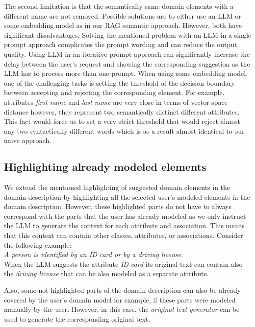 The second limitation is that the semantically same domain elements with a different name are not removed. Possible solutions are to either use an LLM or some embedding model as in our RAG semantic approach. However, both have significant disadvantages. Solving the mentioned problem with an LLM in a single prompt approach complicates the prompt wording and can reduce the output quality. Using LLM in an iterative prompt approach can significantly increase the delay between the user's request and showing the corresponding suggestion as the LLM has to process more than one prompt. When using some embedding model, one of the challenging tasks is setting the threshold of the decision boundary between accepting and rejecting the corresponding element. For example, attributes \textit{first name} and \textit{last name} are very close in terms of vector space distance however, they represent two semantically distinct different attributes. This fact would force us to set a very strict threshold that would reject almost any two syntactically different words which is as a result almost identical to our naive approach.


\subsection{Highlighting already modeled elements}
\label{sec:highlighting_already_modeled_elements}

We extend the mentioned highlighting of suggested domain elements in the domain description by highlighting all the selected user's modeled elements in the domain description. However, these highlighted parts do not have to always correspond with the parts that the user has already modeled as we only instruct the LLM to generate the context for each attribute and association. This means that this context can contain other classes, attributes, or associations. Consider the following example: \\

\noindent{} \textit{A person is identified by an ID card or by a driving license.} \\

\noindent{} When the LLM suggests the attribute \textit{ID card} its original text can contain also the \textit{driving license} that can be also modeled as a separate attribute.

Also, some not highlighted parts of the domain description can also be already covered by the user's domain model for example, if these parts were modeled manually by the user. However, in this case, the \emph{original text generator} can be used to generate the corresponding original text.


